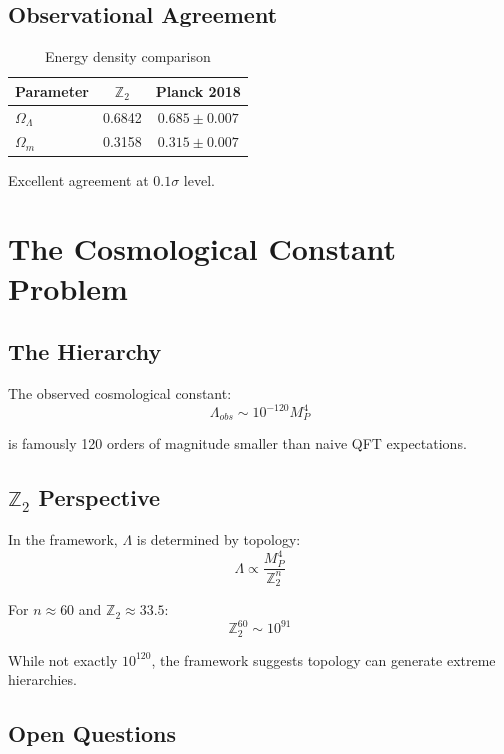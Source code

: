 \documentclass[12pt,a4paper]{article}
\begin{document}
\subsection{Observational Agreement}

\begin{table}[h]
\centering
\begin{tabular}{lcc}
\toprule
Parameter & $\mathbb{Z}_2$ & Planck 2018 \\
\midrule
$\Omega_\Lambda$ & 0.6842 & $0.685 \pm 0.007$ \\
$\Omega_m$ & 0.3158 & $0.315 \pm 0.007$ \\
\bottomrule
\end{tabular}
\caption{Energy density comparison}
\end{table}

Excellent agreement at $0.1\sigma$ level.

\section{The Cosmological Constant Problem}

\subsection{The Hierarchy}

The observed cosmological constant:
\begin{equation}
\Lambda_{obs} \sim 10^{-120} M_P^4
\end{equation}

is famously 120 orders of magnitude smaller than naive QFT expectations.

\subsection{$\mathbb{Z}_2$ Perspective}

In the framework, $\Lambda$ is determined by topology:
\begin{equation}
\Lambda \propto \frac{M_P^4}{\mathbb{Z}_2^n}
\end{equation}

For $n \approx 60$ and $\mathbb{Z}_2 \approx 33.5$:
\begin{equation}
\mathbb{Z}_2^{60} \sim 10^{91}
\end{equation}

While not exactly $10^{120}$, the framework suggests topology can generate extreme hierarchies.

\subsection{Open Questions}
\end{document}
